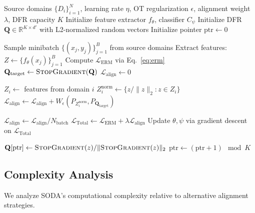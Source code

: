 \documentclass[preprint,12pt]{elsarticle}
\begin{document}
\begin{algorithm}[H]
\caption{SODA: Stabilized Optimal Transport Based Domain Alignment}
\label{alg:sota}
\begin{algorithmic}[1]
    \Require Source domains $\{D_i\}_{i=1}^N$, learning rate $\eta$, OT regularization $\epsilon$, alignment weight $\lambda$, DFR capacity $K$
    \State Initialize feature extractor $f_\theta$, classifier $C_\psi$
    \State Initialize DFR $\mathbf{Q} \in \mathbb{R}^{K \times d'}$ with L2-normalized random vectors
    \State Initialize pointer $\text{ptr} \leftarrow 0$

        \State Sample minibatch $\{(x_j, y_j)\}_{j=1}^B$ from source domains
        \State Extract features: $Z \leftarrow \{f_\theta(x_j)\}_{j=1}^B$
        \State Compute $\mathcal{L}_{\text{ERM}}$ via Eq.~\ref{eq:erm}
        \State $\mathbf{Q}_{\text{target}} \leftarrow \textsc{StopGradient}(\mathbf{Q})$ 
        \State $\mathcal{L}_{\text{align}} \leftarrow 0$

            \State $Z_i \leftarrow$ features from domain $i$
            \State $Z_i^{\text{norm}} \leftarrow \{z / \|z\|_2 : z \in Z_i\}$
            \State $\mathcal{L}_{\text{align}} \leftarrow \mathcal{L}_{\text{align}} + W_{\epsilon}(P_{Z_i^{\text{norm}}}, P_{\mathbf{Q}_{\text{target}}})$
        \EndFor

        \State $\mathcal{L}_{\text{align}} \leftarrow \mathcal{L}_{\text{align}} / N_{\text{batch}}$
        \State $\mathcal{L}_{\text{Total}} \leftarrow \mathcal{L}_{\text{ERM}} + \lambda \mathcal{L}_{\text{align}}$
        \State Update $\theta, \psi$ via gradient descent on $\mathcal{L}_{\text{Total}}$

         
            \State $\mathbf{Q}[\text{ptr}] \leftarrow \textsc{StopGradient}(z) / \|\textsc{StopGradient}(z)\|_2$
            \State $\text{ptr} \leftarrow (\text{ptr} + 1) \mod K$
        \EndFor
    \EndWhile
\end{algorithmic}
\end{algorithm}


\subsection{Complexity Analysis}
\label{sec:complexity}

We analyze SODA's computational complexity relative to alternative alignment strategies.
\end{document}
